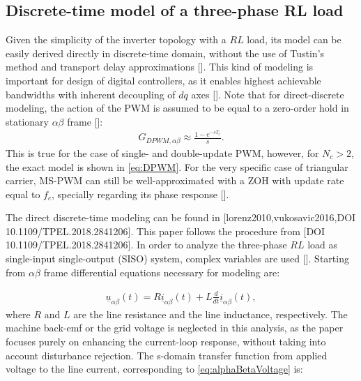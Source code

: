 \documentclass[journal]{IEEEtran}
\begin{document}
\subsection{Discrete-time model of a three-phase RL load}

Given the simplicity of the inverter topology with a $RL$ load, its model can be easily derived directly in discrete-time domain, without the use of Tustin's method and transport delay approximations []. This kind of modeling is important for design of digital controllers, as it enables highest achievable bandwidths with inherent decoupling of $dq$ axes []. 
Note that for direct-discrete modeling, the action of the PWM is assumed to be equal to a zero-order hold in stationary $\alpha \beta$ frame []:
\begin{equation}
\begin{aligned}
G_{DPWM,\alpha \beta} \approx \frac{1-e^{-sT_c}}{s}.
\label{eq:DPWMAlphaBeta} 
\end{aligned}    
\end{equation}
 This is true for the case of single- and double-update PWM, however, for $N_c>2$, the exact model is shown in \eqref{eq:DPWM}. For the very specific case of triangular carrier, MS-PWM can still be well-approximated with a ZOH with update rate equal to $f_c$, specially regarding its phase response [].

The direct discrete-time modeling can be found in [lorenz2010,vukosavic2016,DOI 10.1109/TPEL.2018.2841206]. This paper follows the procedure from [DOI 10.1109/TPEL.2018.2841206].
In order to analyze the three-phase $RL$ load as single-input single-output (SISO) system, complex variables are used []. 
Starting from $\alpha \beta$ frame differential equations necessary for modeling are:

\begin{equation}
\begin{aligned}
\underline{u}_{\alpha \beta} (t) = R \underline{i}_{\alpha \beta} (t) + L \frac{d}{dt} \underline{i}_{\alpha \beta} (t),
\label{eq:alphaBetaVoltage} 
\end{aligned}    
\end{equation}
where $R$ and $L$ are the line resistance and the line inductance, respectively. The machine back-emf or the grid voltage is neglected in this analysis, as the paper focuses purely on enhancing the current-loop response, without taking into account disturbance rejection.
The s-domain transfer function from applied voltage to the line current, corresponding to \eqref{eq:alphaBetaVoltage} is:
\end{document}
